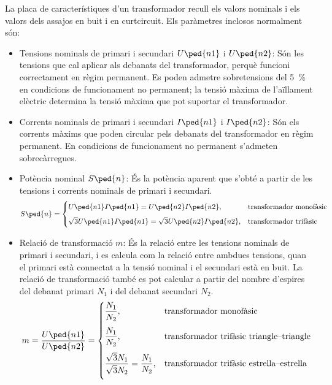 La  placa de característiques d'un transformador recull els valors nominals  i els valors dels assajos
en buit i en curtcircuit. Els paràmetres inclosos normalment són:
\begin{itemize}
   \item Tensions nominals de primari i secundari  $U\ped{n1}$ i $U\ped{n2}$: Són les tensions que cal aplicar als debanats del transformador, perquè funcioni correctament en règim permanent. Es poden admetre sobretensions del \qty{5}{\percent} en condicions de funcionament no permanent; la tensió màxima de l'aïllament elèctric determina la tensió màxima que pot suportar el transformador.
   \item Corrents nominals de primari i secundari  $I\ped{n1}$ i $I\ped{n2}$: Són els corrents màxims que poden circular pels debanats del transformador en règim permanent. En condicions de funcionament no permanent s'admeten sobrecàrregues.
   \item Potència nominal $S\ped{n}$: És la potència aparent que s'obté a partir de les tensions i corrents nominals de primari i secundari.
       \begin{equation}
        S\ped{n} = \begin{cases} U\ped{n1} I\ped{n1} = U\ped{n2} I\ped{n2}, & \text{transformador monofàsic} \\[2mm]
        \sqrt{3} U\ped{n1} I\ped{n1} = \sqrt{3} U\ped{n2} I\ped{n2}, & \text{transformador trifàsic} \end{cases}
       \end{equation}
   \item Relació de transformació $m$: És la relació entre les tensions nominals de primari i secundari, i es calcula com la relació entre ambdues tensions, quan el primari està connectat a la tensió nominal i el secundari està en buit. La relació de  transformació també es pot calcular a partir del nombre d'espires del debanat primari $N_1$ i del debanat secundari $N_2$.
       \begin{equation}
        m = \frac{U\ped{n1}}{U\ped{n2}} =  \begin{cases}
        \dfrac{N_1}{N_2}, & \text{transformador monofàsic} \\[0.4cm]
        \dfrac{N_1}{N_2}, & \text{transformador trifàsic triangle--triangle} \\[0.4cm]
        \dfrac{\sqrt{3}N_1}{\sqrt{3}N_2} = \dfrac{N_1}{N_2}, & \text{transformador trifàsic estrella--estrella} \\[0.4cm]

\end{cases}
\end{equation}
\end{itemize}
